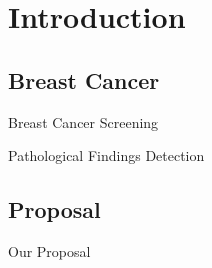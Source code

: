 \section{Introduction}
\subsection{Breast Cancer}

\begin{frame}{Breast Cancer Screening}
    
\end{frame}

\begin{frame}{Pathological Findings Detection}
    
\end{frame}

\subsection{Proposal}
\begin{frame}{Our Proposal}
    
\end{frame}

